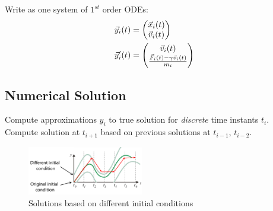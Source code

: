 \begin{multicols}{2}
Write as one system of $1^{st}$ order ODEs:
\begin{align*}
	\vec y_i (t) &= \begin{pmatrix}
 						\vec x_i(t)\\
 						\vec v_i(t)
 					\end{pmatrix}\\
	\vec y_i' (t) &=  \begin{pmatrix}
  						\vec v_i(t)\\
  						{\vec F_i (t) - \gamma \vec v_i (t) \over m_i}
  					   \end{pmatrix}
\end{align*}

\subsection{Numerical Solution}
Compute approximations $y_i$ to true solution for \emph{discrete} time instants $t_i$. Compute solution at $t_{i+1}$ based on previous solutions at $t_{i-1}$, $t_{i-2}$.
\begin{figure}[H]
	\centering
	\includegraphics[width=0.45\textwidth]{img/01_initial_conditions}
	\caption{Solutions based on different initial conditions}
\end{figure}


\end{multicols}
